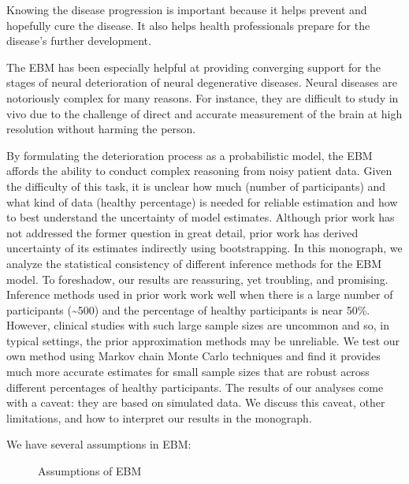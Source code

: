 \documentclass[
  letterpaper,
  DIV=11,
  numbers=noendperiod]{scrreprt}
\begin{document}
Knowing the disease progression is important because it helps prevent
and hopefully cure the disease. It also helps health professionals
prepare for the disease's further development.

The EBM has been especially helpful at providing converging support for
the stages of neural deterioration of neural degenerative diseases.
Neural diseases are notoriously complex for many reasons. For instance,
they are difficult to study in vivo due to the challenge of direct and
accurate measurement of the brain at high resolution without harming the
person.

By formulating the deterioration process as a probabilistic model, the
EBM affords the ability to conduct complex reasoning from noisy patient
data. Given the difficulty of this task, it is unclear how much (number
of participants) and what kind of data (healthy percentage) is needed
for reliable estimation and how to best understand the uncertainty of
model estimates. Although prior work has not addressed the former
question in great detail, prior work has derived uncertainty of its
estimates indirectly using bootstrapping. In this monograph, we analyze
the statistical consistency of different inference methods for the EBM
model. To foreshadow, our results are reassuring, yet troubling, and
promising. Inference methods used in prior work work well when there is
a large number of participants (\textasciitilde500) and the percentage
of healthy participants is near 50\%. However, clinical studies with
such large sample sizes are uncommon and so, in typical settings, the
prior approximation methods may be unreliable. We test our own method
using Markov chain Monte Carlo techniques and find it provides much more
accurate estimates for small sample sizes that are robust across
different percentages of healthy participants. The results of our
analyses come with a caveat: they are based on simulated data. We
discuss this caveat, other limitations, and how to interpret our results
in the monograph.

We have several assumptions in EBM:

\begin{figure}


\caption{\label{fig-ebm-assumptions}Assumptions of EBM}

\end{figure}%
\end{document}
